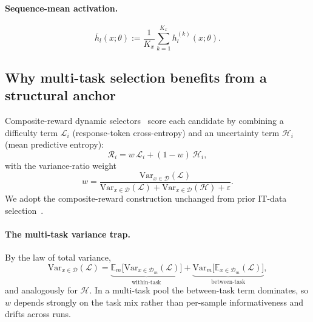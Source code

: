 \paragraph{Sequence-mean activation.}
\begin{equation}
  \bar h_l(x;\theta) :=
  \frac{1}{K_x}\sum_{k=1}^{K_x} h_l^{(k)}(x;\theta).
  \label{eq:meanact}
\end{equation}

\subsection{Why multi-task selection benefits from a structural anchor}
\label{sec:method-motivation}

Composite-reward dynamic selectors~\cite{kung2023activeit,
sun2025dots} score each candidate by combining a difficulty term
$\mathcal{L}_i$ (response-token cross-entropy) and an uncertainty
term $\mathcal{H}_i$ (mean predictive entropy):
\begin{equation}
  \mathcal{R}_i = w\,\mathcal{L}_i + (1-w)\,\mathcal{H}_i,
  \label{eq:composite}
\end{equation}
with the variance-ratio weight
\begin{equation}
  w =
  \frac{\mathrm{Var}_{x \in \mathcal{D}}(\mathcal{L})}
       {\mathrm{Var}_{x \in \mathcal{D}}(\mathcal{L}) +
        \mathrm{Var}_{x \in \mathcal{D}}(\mathcal{H}) + \varepsilon}.
  \label{eq:w}
\end{equation}
We adopt the composite-reward construction unchanged from prior
IT-data selection~\cite{sun2025dots, kung2023activeit}.

\paragraph{The multi-task variance trap.}
By the law of total variance,
\begin{equation}
  \mathrm{Var}_{x \in \mathcal{D}}(\mathcal{L})
  =
  \underbrace{\mathbb{E}_{m}\bigl[\mathrm{Var}_{x \in \mathcal{D}_m}(\mathcal{L})\bigr]}_{\text{within-task}}
  +
  \underbrace{\mathrm{Var}_{m}\bigl[\mathbb{E}_{x \in \mathcal{D}_m}(\mathcal{L})\bigr]}_{\text{between-task}},
  \label{eq:total-variance}
\end{equation}
and analogously for $\mathcal{H}$. In a multi-task pool the
between-task term dominates, so $w$ depends strongly on the task
mix rather than per-sample informativeness and drifts across runs.

